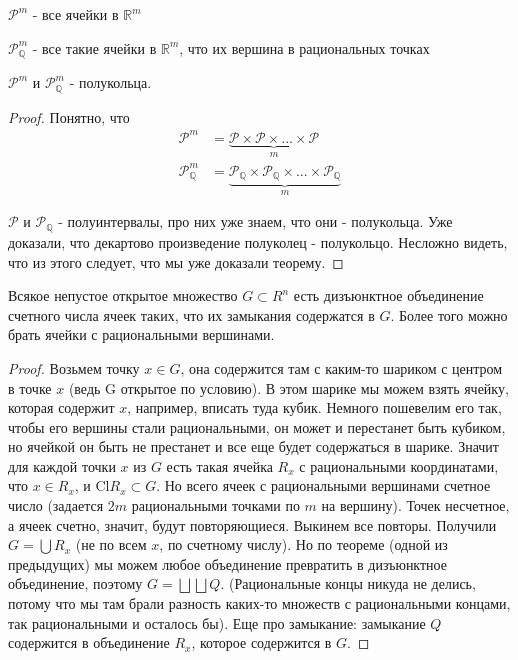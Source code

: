 
\begin{definition} \thmslashn

  $\mathcal{P}^m$ - все ячейки в $\mathbb{R}^m$
  
  $\mathcal{P}^m_{\mathbb{Q}}$ - все такие ячейки в $\mathbb{R}^m$, что их вершина в рациональных точках\\
\end{definition}
\begin{theorem} \thmslashn

  $\mathcal{P}^m$ и $\mathcal{P}^m_{\mathbb{Q}}$ - полукольца.
  \begin{proof} \thmslashn

    Понятно, что
    \begin{align*}
      \mathcal{P}^m &= \underbrace{\mathcal{P} \times \mathcal{P} \times ... \times \mathcal{P}}_m\\
      \mathcal{P}^m_{\mathbb{Q}} &= \underbrace{\mathcal{P}_{\mathbb{Q}} \times \mathcal{P}_{\mathbb{Q}} \times ... \times \mathcal{P}_{\mathbb{Q}}}_m
    \end{align*}
    
    $\mathcal{P}$ и $\mathcal{P}_{\mathbb{Q}}$ - полуинтервалы, про них уже знаем, что они - полукольца. Уже доказали, что декартово произведение полуколец - полукольцо. Несложно видеть, что из этого следует, что мы уже доказали теорему.
  \end{proof}
\end{theorem}
\begin{theorem} \thmslashn

  Всякое непустое открытое множество $G \subset R^n$ есть дизъюнктное объединение счетного числа ячеек таких, что их замыкания содержатся в $G$. Более того можно брать ячейки с рациональными вершинами.
  \begin{proof} \thmslashn

    Возьмем точку $x\in G$, она содержится там с каким-то шариком с центром в точке $x$ (ведь G открытое по условию). В этом шарике мы можем взять ячейку, которая содержит $x$, например, вписать туда кубик. Немного пошевелим его так, чтобы его вершины стали рациональными, он может и перестанет быть кубиком, но ячейкой он быть не престанет и все еще будет содержаться в шарике. Значит для каждой точки $x$ из $G$ есть такая ячейка $R_x$ с рациональными координатами, что $x \in R_x$, и $\text{Cl}R_x\subset G$. Но всего ячеек с рациональными вершинами счетное число (задается $2m$ рациональными точками по $m$ на вершину). Точек несчетное, а ячеек счетно, значит, будут повторяющиеся. Выкинем все повторы. Получили $G = \bigcup R_x$ (не по всем $x$, по счетному числу). Но по теореме (одной из предыдущих) мы можем любое объединение превратить в дизъюнктное объединение, поэтому $G = \bigsqcup\bigsqcup Q$. (Рациональные концы никуда не делись, потому что мы там брали разность каких-то множеств с рациональными концами, так рациональными и осталось бы). Еще про замыкание: замыкание $Q$ содержится в объединение $R_x$, которое содержится в $G$.
  \end{proof}
\end{theorem}
